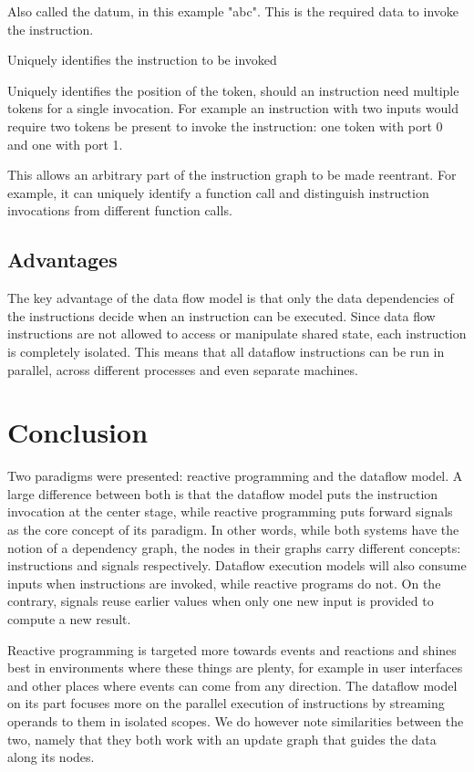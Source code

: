 \begin{description}[style=nextline]
	\item[The value] Also called the datum, in this example "abc". This is the required data to invoke the instruction.
	\item[The instruction address] Uniquely identifies the instruction to be invoked
	\item[The port] Uniquely identifies the position of the token, should an instruction need multiple tokens for a single invocation. For example an instruction with two inputs would require two tokens be present to invoke the instruction: one token with port 0 and one with port 1. 
	\item[The execution context] This allows an arbitrary part of the instruction graph to be made reentrant. For example, it can uniquely identify a function call and distinguish instruction invocations from different function calls.
\end{description}

\subsection{Advantages}

The key advantage of the data flow model is that only the data dependencies of the instructions decide when an instruction can be executed. Since data flow instructions are not allowed to access or manipulate shared state, each instruction is completely isolated. This means that all dataflow instructions can be run in parallel, across different processes and even separate machines.

\section{Conclusion}

Two paradigms were presented: reactive programming and the dataflow model. A large difference between both is that the dataflow model puts the instruction invocation at the center stage, while reactive programming puts forward signals as the core concept of its paradigm. In other words, while both systems have the notion of a dependency graph, the nodes in their graphs carry different concepts: instructions and signals respectively. Dataflow execution models will also consume  inputs when instructions are invoked, while reactive programs do not. On the contrary, signals reuse earlier values when only one new input is provided to compute a new result. 

Reactive programming is targeted more towards events and reactions and shines best in environments where these things are plenty, for example in user interfaces and other places where events can come from any direction. The dataflow model on its part focuses more on the parallel execution of instructions by streaming operands to them in isolated scopes. We do however note similarities between the two, namely that they both work with an update graph that guides the data along its nodes.